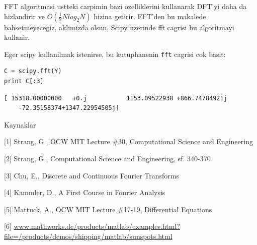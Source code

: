 \documentclass[12pt,fleqn]{article}\usepackage{../common}
\begin{document}
FFT algoritmasi ustteki carpimin bazi ozelliklerini kullanarak DFT'yi
daha da hizlandirir ve $O(\frac{1}{2}Nlog_2N)$ hizina getirir. FFT'den
bu makalede bahsetmeyecegiz, aklimizda olsun, Scipy uzerinde fft
cagrisi bu algoritmayi kullanir.

Eger scipy kullanilmak istenirse, bu kutuphanenin \verb!fft! cagrisi cok
basit:

\begin{verbatim}
C = scipy.fft(Y)
print C[:3]
\end{verbatim}

\begin{verbatim}
[ 15318.00000000   +0.j           1153.09522938 +866.74784921j
    -72.35158374+1347.22954505j]
\end{verbatim}

Kaynaklar

[1] Strang, G., OCW MIT Lecture \#30, Computational Science and Engineering

[2] Strang, G., Computational Science and Engineering, sf. 340-370

[3] Chu, E., Discrete and Continuous Fourier Transforms

[4] Kammler, D., A First Course in Fourier Analysis

[5] Mattuck, A., OCW MIT Lecture \#17-19, Differential Equations

[6] \url{www.mathworks.de/products/matlab/examples.html?file=/products/demos/shipping/matlab/sunspots.html}
\end{document}
